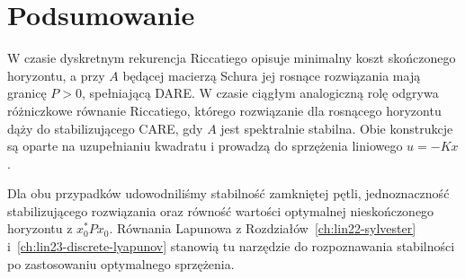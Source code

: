 \section{Podsumowanie}
\label{sec:lin24-summary}

W czasie dyskretnym
rekurencja Riccatiego
opisuje minimalny koszt
skończonego horyzontu,
a przy \(A\) będącej macierzą Schura
jej rosnące rozwiązania
mają granicę \(P>0\),
spełniającą DARE.
W czasie ciągłym
analogiczną rolę odgrywa
różniczkowe równanie Riccatiego,
którego rozwiązanie dla
rosnącego horyzontu
dąży do stabilizującego CARE,
gdy \(A\) jest spektralnie stabilna.
Obie konstrukcje są
oparte na uzupełnianiu
kwadratu i prowadzą do
sprzężenia liniowego
\(u=-Kx\).

Dla obu przypadków
udowodniliśmy stabilność
zamkniętej pętli,
jednoznaczność
stabilizującego rozwiązania
oraz równość
wartości optymalnej
nieskończonego horyzontu
z \(x_0^*Px_0\).
Równania Lapunowa
z Rozdziałów~\ref{ch:lin22-sylvester}
i~\ref{ch:lin23-discrete-lyapunov}
stanowią tu narzędzie
do rozpoznawania
stabilności po zastosowaniu
optymalnego sprzężenia.
